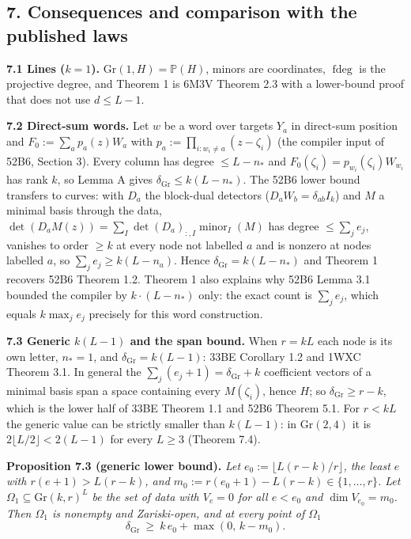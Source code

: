 \documentclass[
  11pt,
  a4paper,
]{article}
\newcounter{none} %
\begin{document}
\subsection{7. Consequences and comparison with the published
laws}\label{consequences-and-comparison-with-the-published-laws}

\textbf{7.1 Lines (\(k=1\)).} \(\mathrm{Gr}(1,\allowbreak{}H)=\mathbb P(H)\), minors
are coordinates, \(\operatorname{fdeg}\) is the projective degree, and
Theorem 1 is 6M3V Theorem 2.3 with a lower-bound proof that does not use
\(d\le L-1\).

\textbf{7.2 Direct-sum words.} Let \(w\) be a word over targets \(Y_a\)
in direct-sum position and \(F_0:=\sum_ap_a(z)W_a\) with
\(p_a:=\prod_{i:w_i\ne a}(z-\zeta_i)\) (the compiler input of 52B6,
Section 3). Every column has degree \(\le L-n_*\) and
\(F_0(\zeta_i)=p_{w_i}(\zeta_i)W_{w_i}\) has rank \(k\), so Lemma A
gives \(\delta_{\mathrm{Gr}}\le k(L-n_*)\). The 52B6 lower bound
transfers to curves: with \(D_a\) the block-dual detectors
(\(D_aW_b=\delta_{ab}I_k\)) and \(M\) a minimal basis through the data,
\(\det(D_aM(z))=\sum_I\det(D_a)_{:,\allowbreak{}I}\operatorname{minor}_I(M)\) has
degree \(\le\sum_je_j\), vanishes to order \(\ge k\) at every node not
labelled \(a\) and is nonzero at nodes labelled \(a\), so
\(\sum_je_j\ge k(L-n_a)\). Hence \(\delta_{\mathrm{Gr}}=k(L-n_*)\) and
Theorem 1 recovers 52B6 Theorem 1.2. Theorem 1 also explains why 52B6
Lemma 3.1 bounded the compiler by \(k\cdot(L-n_*)\) only: the exact
count is \(\sum_je_j\), which equals \(k\max_je_j\) precisely for this
word construction.

\textbf{7.3 Generic \(k(L-1)\) and the span bound.} When \(r=kL\) each
node is its own letter, \(n_*=1\), and \(\delta_{\mathrm{Gr}}=k(L-1)\):
33BE Corollary 1.2 and 1WXC Theorem 3.1. In general the
\(\sum_j(e_j+1)=\delta_{\mathrm{Gr}}+k\) coefficient vectors of a
minimal basis span a space containing every \(M(\zeta_i)\), hence \(H\);
so \(\delta_{\mathrm{Gr}}\ge r-k\), which is the lower half of 33BE
Theorem 1.1 and 52B6 Theorem 5.1. For \(r<kL\) the generic value can be
strictly smaller than \(k(L-1)\): in \(\mathrm{Gr}(2,\allowbreak{}4)\) it is
\(2\lfloor L/2\rfloor<2(L-1)\) for every \(L\ge3\) (Theorem 7.4).

\textbf{Proposition 7.3 (generic lower bound).} \emph{Let
\(e_0:=\lfloor L(r-k)/r\rfloor\), the least \(e\) with
\(r(e+1)>L(r-k)\), and \(m_0:=r(e_0+1)-L(r-k)\in\{1,\allowbreak{}\dots,\allowbreak{}r\}\). Let
\(\Omega_1\subseteq\mathrm{Gr}(k,\allowbreak{}r)^L\) be the set of data with
\(V_e=0\) for all \(e<e_0\) and \(\dim V_{e_0}=m_0\). Then \(\Omega_1\)
is nonempty and Zariski-open, and at every point of \(\Omega_1\)}
\[\delta_{\mathrm{Gr}}\ \ge\ k\,e_0+\max(0,\,k-m_0).\]
\end{document}
